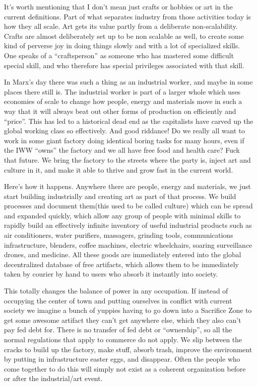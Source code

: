It's worth mentioning that I don't mean just crafts or hobbies or art in
the current definitions. Part of what separates industry from those
activities today is how they all scale. Art gets its value partly from a
deliberate non-scalability. Crafts are almost deliberately set up to be
non scalable as well, to create some kind of perverse joy in doing
things slowly and with a lot of specialized skills. One speaks of a
``craftsperson'' as someone who has mastered some difficult special
skill, and who therefore has special privileges associated with that
skill.

In Marx's day there was such a thing as an industrial worker, and maybe
in some places there still is. The industrial worker is part of a larger
whole which uses economies of scale to change how people, energy and
materials move in such a way that it will always beat out other forms of
production on efficiently and ``price''. This has led to a historical
dead end as the capitalists have carved up the global working class so
effectively. And good riddance! Do we really all want to work in some
giant factory doing identical boring tasks for many hours, even if the
IWW ``owns'' the factory and we all have free food and health care? Fuck
that future. We bring the factory to the streets where the party is,
inject art and culture in it, and make it able to thrive and grow fast
in the current world.

Here's how it happens. Anywhere there are people, energy and materials,
we just start building industrially and creating art as part of that
process. We build processes and document them(this used to be called
culture) which can be spread and expanded quickly, which allow any group
of people with minimal skills to rapidly build an effectively infinite
inventory of useful industrial products such as air conditioners, water
purifiers, massagers, grinding tools, communications infrastructure,
blenders, coffee machines, electric wheelchairs, soaring surveillance
drones, and medicine. All these goods are immediately entered into the
global decentralized database of free artifacts, which allows them to be
immediately taken by courier by hand to users who absorb it instantly
into society.

This totally changes the balance of power in any occupation. If instead
of occupying the center of town and putting ourselves in conflict with
current society we imagine a bunch of yuppies having to go down into a
Sacrifice Zone to get some awesome artifact they can't get anywhere
else, which they also can't pay fed debt for. There is no transfer of
fed debt or ``ownership'', so all the normal regulations that apply to
commerce do not apply. We slip between the cracks to build up the
factory, make stuff, absorb trash, improve the environment by putting in
infrastructure easter eggs, and disappear. Often the people who come
together to do this will simply not exist as a coherent organization
before or after the industrial/art event.

